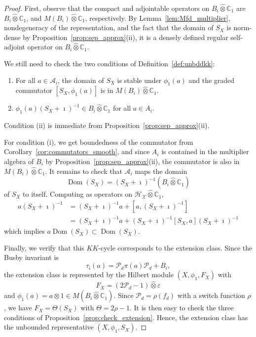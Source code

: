 \documentclass[12pt]{amsart}
\newcommand{\CM}{{\mathbb C}}
\newcommand{\Aa}{{\mathcal A}}
\newcommand{\Pp}{{\mathcal P}}
\newcommand{\Hh}{{\mathcal H}}
\newcommand{\Xx}{{\mathcal X}}
\newcommand{\ep}{\varepsilon}
\DeclareMathOperator*{\Dom}{Dom}
\begin{document}
\begin{proof}
First, observe that the compact and adjointable operators on $B_i\hat{\otimes}\CM_1$ are $B_i\hat{\otimes} \CM_1$, and $M(B_i)\hat{\otimes}\CM_1$, respectively. 
By Lemma~\ref{lem:Mfd_multiplier}, nondegeneracy of the representation, and the fact that the domain of $S_X$ is norm-dense by Proposition~\ref{prop:sep_approx}(ii), it is a densely defined regular self-adjoint operator on $B_i\hat{\otimes} \CM_1$. 

We still need to check the two conditions of Definition~\ref{def:unbddkk}:
\begin{enumerate}
    \item[(i)] For all $a \in \Aa_i$, the domain of $S_X$ is stable under $\phi_1(a)$ and the graded commutator $[S_X, \phi_1(a)]$ is in $M(B_i) \hat{\otimes} \CM_1$.
    \item[(ii)] $\phi_1(a)(S_X+\imath)^{-1} \in B_i\hat{\otimes}\CM_1$ for all $a\in A_i$.
\end{enumerate}
Condition (ii) is immediate from Proposition~\ref{prop:sep_approx}(ii).

For condition (i), we get boundedness of the commutator from Corollary~\ref{cor:commutators_smooth}, and since $A_i$ is contained in the multiplier algebra of $B_i$ by Proposition~\ref{prop:sep_approx}(ii), the commutator is also in $M(B_i)\hat{\otimes}\CM_1$.
It remains to check that $\Aa_i$ maps the domain 
$$\Dom(S_X)= (S_X + \imath)^{-1} (B_i\hat{\otimes}\CM_1)$$
of $S_X$ to itself. Computing as operators on $\Hh_\Xx\hat{\otimes}\CM_1$,
\begin{align*}
a (S_X + \imath)^{-1} &= (S_X + \imath)^{-1} a + [a,(S_X + \imath)^{-1}]\\
&= (S_X + \imath)^{-1} a + (S_X + \imath)^{-1}[S_X,a](S_X + \imath)^{-1}
\end{align*}
which implies $a \Dom(S_X)\subset \Dom(S_X)$.

Finally, we verify that this $KK$-cycle corresponds to the extension class. Since the Busby invariant is
\[\tau_i(a) = \Pp_{d} \pi(a) \Pp_{d} + B_i,\]
the extension class is represented by the Hilbert module $(X, \phi_1, F_X)$ with 
\[F_X=(2\Pp_{d}-1)\hat{\otimes}\ep\]
and $\phi_1(a)= a \hat{\otimes} 1 \in M(B_i\hat{\otimes} \CM_1)$. Since $\Pp_d=\rho(f_d)$ with a switch function $\rho$, we have $F_X=\Theta(S_X)$ with $\Theta = 2\rho-1$.
It is then easy to check the three conditions of Proposition~\ref{prop:check_extension}.
Hence, the extension class has the unbounded representative $(X, \phi_1, S_X)$.
\end{proof}
\end{document}
